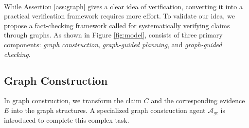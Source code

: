 \paragraph{{\MyFC}} While Assertion \ref{ass:graph} gives a clear idea of verification, converting it into a practical verification framework requires more effort. To validate our idea, we propose a fact-checking framework called {\bf {\MyFC}} for systematically verifying claims through graphs. As shown in Figure \ref{fig:model}, {\MyFC} consists of three primary components: {\it graph construction}, {\it graph-guided planning}, and {\it graph-guided checking}. 

\subsection{Graph Construction}\label{sec:Graph Construction}
In graph construction, we transform the claim $C$ and the corresponding evidence $E$ into the graph structures. A specialized graph construction agent $\mathcal{A}_{gc}$ is introduced to complete this complex task.


